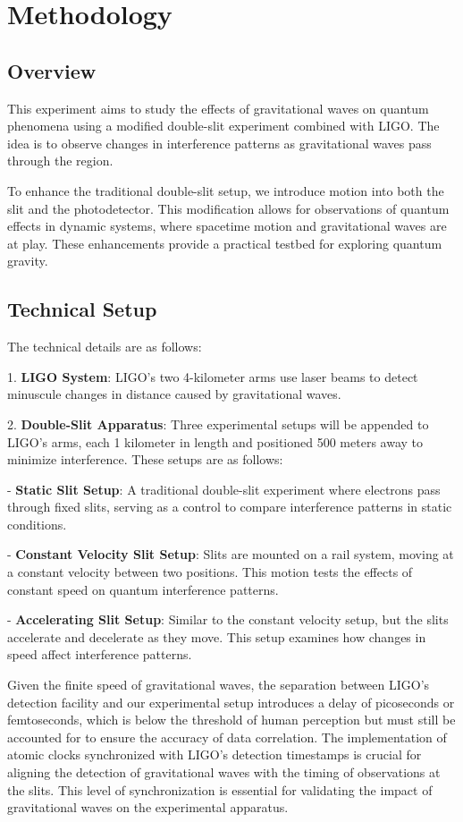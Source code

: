 \documentclass{article}
\begin{document}
\section{Methodology}

\subsection{Overview}
This experiment aims to study the effects of gravitational waves on quantum phenomena using a modified double-slit experiment combined with LIGO. The idea is to observe changes in interference patterns as gravitational waves pass through the region. 

To enhance the traditional double-slit setup, we introduce motion into both the slit and the photodetector. This modification allows for observations of quantum effects in dynamic systems, where spacetime motion and gravitational waves are at play. These enhancements provide a practical testbed for exploring quantum gravity.

\subsection{Technical Setup}
The technical details are as follows:

1. \textbf{LIGO System}: LIGO's two 4-kilometer arms use laser beams to detect minuscule changes in distance caused by gravitational waves.

2. \textbf{Double-Slit Apparatus}: Three experimental setups will be appended to LIGO's arms, each 1 kilometer in length and positioned 500 meters away to minimize interference. These setups are as follows:

   - \textbf{Static Slit Setup}: A traditional double-slit experiment where electrons pass through fixed slits, serving as a control to compare interference patterns in static conditions.
   
   - \textbf{Constant Velocity Slit Setup}: Slits are mounted on a rail system, moving at a constant velocity between two positions. This motion tests the effects of constant speed on quantum interference patterns.
   
   - \textbf{Accelerating Slit Setup}: Similar to the constant velocity setup, but the slits accelerate and decelerate as they move. This setup examines how changes in speed affect interference patterns.
\newline

Given the finite speed of gravitational waves, the separation between LIGO’s detection facility and our experimental setup introduces a delay of picoseconds or femtoseconds, which is below the threshold of human perception but must still be accounted for to ensure the accuracy of data correlation. The implementation of atomic clocks synchronized with LIGO’s detection timestamps is crucial for aligning the detection of gravitational waves with the timing of observations at the slits. This level of synchronization is essential for validating the impact of gravitational waves on the experimental apparatus.
\end{document}
